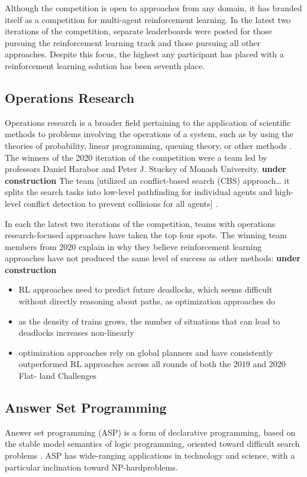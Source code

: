 \documentclass[11pt]{article}
\begin{document}
Although the competition is open to approaches from any domain, it has branded itself as a competition for multi-agent reinforcement learning.  In the latest two iterations of the competition, separate leaderboards were posted for those pursuing the reinforcement learning track and those pursuing all other approaches.  Despite this focus, the highest any participant has placed with a reinforcement learning solution has been seventh place.

\subsection{Operations Research}
Operations research is a broader field pertaining to the application of scientific methods to problems involving the operations of a system, such as by using the theories of probability, linear programming, queuing theory, or other methods \citep{gupta92a}.  The winners of the 2020 iteration of the competition were a team led by professors Daniel Harabor and Peter J. Stuckey of Monash University.  \textbf{under construction} The team [utilized an conflict-based search (CBS) approach… it splits the search tasks into low-level pathfinding for individual agents and high-level conflict detection to prevent collisions for all agents] \citep{lichzhchhastmako21a}.

In each the latest two iterations of the competition, teams with operations research-focused approaches have taken the top four spots.  The winning team members from 2020 explain in \citep{lichzhchhastmako21a} why they believe reinforcement learning approaches have not produced the same level of success as other methods: \textbf{under construction}
\begin{itemize}
	\item RL approaches need to predict future deadlocks, which seems difficult without directly reasoning about paths, as optimization approaches do
	\item as the density of trains grows, the number of situations that can lead to deadlocks increases non-linearly
	\item optimization approaches rely on global planners and have consistently outperformed RL approaches across all rounds of both the 2019 and 2020 Flat- land Challenges
\end{itemize}


\subsection{Answer Set Programming}
Answer set programming (ASP) is a form of declarative programming, based on the stable model semantics of logic programming, oriented toward difficult search problems \citep{lifschitz19a}.  ASP has wide-ranging applications in technology and science, with a particular inclination toward NP-hard\footnotemark problems.
\end{document}
